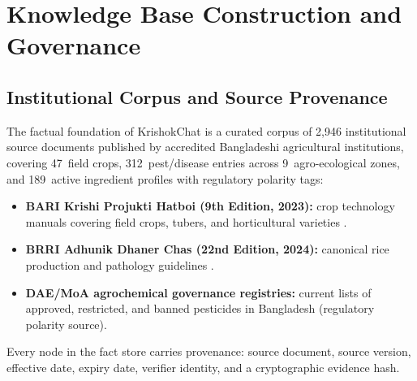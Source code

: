 
\section{Knowledge Base Construction and Governance}
\label{sec:knowledge_governance}

\subsection{Institutional Corpus and Source Provenance}
The factual foundation of KrishokChat is a curated corpus of 2{,}946 institutional source documents published by accredited Bangladeshi agricultural institutions, covering 47~field crops, 312~pest/disease entries across 9~agro-ecological zones, and 189~active ingredient profiles with regulatory polarity tags:
\begin{itemize}
    \item \textbf{BARI Krishi Projukti Hatboi (9th Edition, 2023):} crop technology manuals covering field crops, tubers, and horticultural varieties \citep{bari_handbook2023}.
    \item \textbf{BRRI Adhunik Dhaner Chas (22nd Edition, 2024):} canonical rice production and pathology guidelines \citep{brri_handbook2024}.
    \item \textbf{DAE/MoA agrochemical governance registries:} current lists of approved, restricted, and banned pesticides in Bangladesh (regulatory polarity source).
\end{itemize}
Every node in the fact store carries provenance: source document, source version, effective date, expiry date, verifier identity, and a cryptographic evidence hash.

